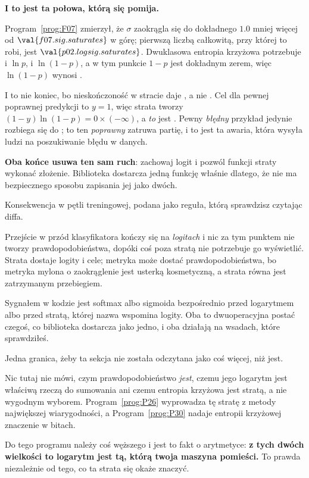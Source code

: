 \begin{fr}

\begin{trapbox}
\textbf{I to jest ta połowa, którą się pomija.}

Program~\ref{prog:F07} zmierzył, że $\sigma$ zaokrągla się do dokładnego
$\num{1.0}$ mniej więcej od $\val{f07.sig.saturates}$ w górę; pierwszą liczbą
całkowitą, przy której to robi, jest $\val{p02.logsig.saturates}$. Dwuklasowa
entropia krzyżowa potrzebuje i $\ln p$, i $\ln(1 - p)$, a w tym punkcie
$1 - p$ jest dokładnym zerem, więc $\ln(1 - p)$ wynosi
.

I to nie koniec, bo nieskończoność w stracie daje , a nie
. Cel dla pewnej poprawnej predykcji to $y = 1$, więc strata tworzy
$(1 - y)\ln(1 - p) = 0 \times (-\infty)$, a \emph{to} jest . Pewny
\emph{błędny} przykład jedynie rozbiega się do ; to ten
\emph{poprawny} zatruwa partię, i to jest ta awaria, która wysyła ludzi na
poszukiwanie błędu w danych.

\textbf{Oba końce usuwa ten sam ruch}: zachowaj logit i pozwól funkcji straty
wykonać złożenie. Biblioteka dostarcza jedną funkcję właśnie dlatego, że nie ma
bezpiecznego sposobu zapisania jej jako dwóch.
\end{trapbox}
\end{fr}

\begin{fr}
\begin{aibox}
Konsekwencja w pętli treningowej, podana jako reguła, którą sprawdzisz czytając
diffa.

Przejście w przód klasyfikatora kończy się na \emph{logitach} i nic za tym
punktem nie tworzy prawdopodobieństwa, dopóki coś poza stratą nie potrzebuje go
wyświetlić. Strata dostaje logity i cele; metryka może dostać
prawdopodobieństwa, bo metryka mylona o zaokrąglenie jest usterką kosmetyczną,
a strata równa  jest zatrzymanym przebiegiem.

Sygnałem w kodzie jest softmax albo sigmoida bezpośrednio przed logarytmem albo
przed stratą, której nazwa wspomina logity. Oba to dwuoperacyjna postać czegoś,
co biblioteka dostarcza jako jedno, i oba działają na wsadach, które
sprawdziłeś.
\end{aibox}
\end{fr}

\begin{fr}
Jedna granica, żeby ta sekcja nie została odczytana jako coś więcej, niż jest.

Nic tutaj nie mówi, czym prawdopodobieństwo \emph{jest}, czemu jego logarytm
jest właściwą rzeczą do sumowania ani czemu entropia krzyżowa jest stratą, a
nie wygodnym wyborem. Program~\ref{prog:P26} wyprowadza tę stratę z metody
największej wiarygodności, a Program~\ref{prog:P30} nadaje entropii krzyżowej
znaczenie w bitach.

Do tego programu należy coś węższego i jest to fakt o arytmetyce: \textbf{z
tych dwóch wielkości to logarytm jest tą, którą twoja maszyna pomieści.} To
prawda niezależnie od tego, co ta strata się okaże znaczyć.
\end{fr}

